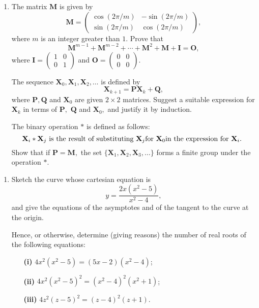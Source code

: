 \documentclass[a4, 11pt]{report}
\newlength{\qspace}
\newcounter{qnumber}
\newenvironment{question}%
 {\vspace{\qspace}
  \begin{enumerate}[\bfseries 1\quad][10]%
    \setcounter{enumi}{\value{qnumber}}%
    \item%
 }
{
  \end{enumerate}
  \filbreak
  \stepcounter{qnumber}
 }
\begin{document}
\vspace{-1cm}
\begin{question}
The matrix $\mathbf{M}$ is given by 
\[
\mathbf{M}=\begin{pmatrix}\cos(2\pi/m) & -\sin(2\pi/m)\\
\sin(2\pi/m) & \cos(2\pi/m)
\end{pmatrix},
\]
where $m$ is an integer greater than $1.$ Prove that 
\[
\mathbf{M}^{m-1}+\mathbf{M}^{m-2}+\cdots+\mathbf{M}^{2}+\mathbf{M}+\mathbf{I}=\mathbf{O},
\]
where $\mathbf{I}=\begin{pmatrix}1 & 0\\
0 & 1
\end{pmatrix}$ and $\mathbf{O}=\begin{pmatrix}0 & 0\\
0 & 0
\end{pmatrix}.$


The sequence $\mathbf{X}_{0},\mathbf{X}_{1},\mathbf{X}_{2},\ldots$
is defined by 
\[
\mathbf{X}_{k+1}=\mathbf{PX}_{k}+\mathbf{Q},
\]
where $\mathbf{P,Q}$ and $\mathbf{X}_{0}$ are given $2\times2$
matrices. Suggest a suitable expression for $\mathbf{X}_{k}$ in terms
of $\mathbf{P},$ $\mathbf{Q}$ and $\mathbf{X}_{0},$ and justify
it by induction. 


The binary operation $*$ is defined as follows: 
\[
\mathbf{X}_{i}*\mathbf{X}_{j}\mbox{ is the result of substituting \ensuremath{\mathbf{X}_{j}}for \ensuremath{\mathbf{X}_{0}}in the expression for \ensuremath{\mathbf{X}_{i}}. }
\]
Show that if $\mathbf{P=M},$ the set $\{\mathbf{X}_{1},\mathbf{X}_{2},\mathbf{X}_{3},\ldots\}$
forms a finite group under the operation $*$. 
\end{question}



\begin{question}
Sketch the curve whose cartesian equation is 
\[
y=\frac{2x(x^{2}-5)}{x^{2}-4},
\]
and give the equations of the asymptotes and of the tangent to the
curve at the origin. 


Hence, or otherwise, determine (giving reasons) the number of real
roots of the following equations: 
\begin{itemize}
\setlength{\itemsep}{3mm}
\item[\bf (i)] $4x^{2}(x^{2}-5)=(5x-2)(x^{2}-4)$; 
\item[\bf (ii)] $4x^{2}(x^{2}-5)^{2}=(x^{2}-4)^{2}(x^{2}+1)$; 
\item[\bf (iii)] $4z^{2}(z-5)^{2}=(z-4)^{2}(z+1)$. 
	\end{itemize}

\end{question}
\end{document}
